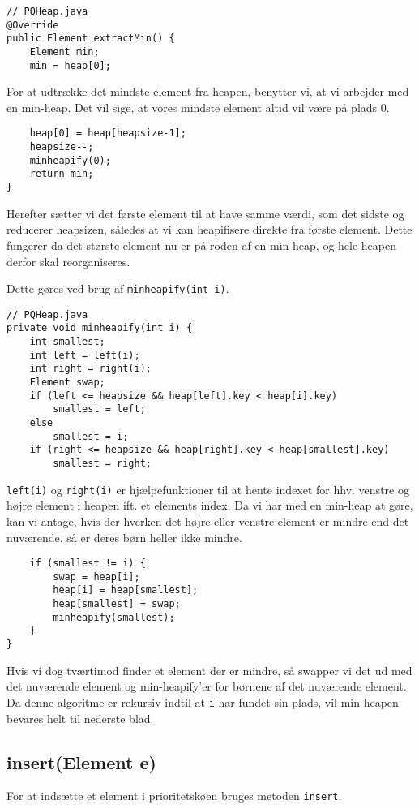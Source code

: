 \documentclass{article}
\begin{document}
\begin{lstlisting}
// PQHeap.java
@Override
public Element extractMin() {
    Element min;
    min = heap[0];    
\end{lstlisting}
For at udtrække det mindste element fra heapen, benytter vi, at vi arbejder med en min-heap. Det vil sige, at vores mindste element altid vil være på plads 0.
\begin{lstlisting}    
    heap[0] = heap[heapsize-1];
    heapsize--;
    minheapify(0);
    return min;
}
\end{lstlisting}
Herefter sætter vi det første element til at have samme værdi, som det sidste og reducerer heapsizen, således at vi kan heapifisere direkte fra første element. Dette fungerer da det største element nu er på roden af en min-heap, og hele heapen derfor skal reorganiseres. \newline

\noindent Dette gøres ved brug af \texttt{minheapify(int i)}.

\newpage

\begin{lstlisting}
// PQHeap.java
private void minheapify(int i) {
    int smallest;
    int left = left(i);
    int right = right(i);
    Element swap;
    if (left <= heapsize && heap[left].key < heap[i].key)
        smallest = left;
    else
        smallest = i;
    if (right <= heapsize && heap[right].key < heap[smallest].key)
        smallest = right;
\end{lstlisting}
\texttt{left(i)} og \texttt{right(i)} er hjælpefunktioner til at hente indexet for hhv. venstre og højre element i heapen ift. et elements index.
Da vi har med en min-heap at gøre, kan vi antage, hvis der hverken det højre eller venstre element er mindre end det nuværende, så er deres børn heller ikke mindre.
\begin{lstlisting}
    if (smallest != i) {
        swap = heap[i];
        heap[i] = heap[smallest];
        heap[smallest] = swap;
        minheapify(smallest);
    }
}
\end{lstlisting}
 Hvis vi dog tværtimod finder et element der er mindre, så swapper vi det ud med det nuværende element og min-heapify'er for børnene af det nuværende element. Da denne algoritme er rekursiv indtil at \texttt{i} har fundet sin plads, vil min-heapen bevares helt til nederste blad.
 
\subsection*{insert(Element e)}
For at indsætte et element i prioritetskøen bruges metoden \texttt{insert}.
\end{document}
